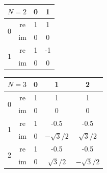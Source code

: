 \begin{center}
	\begin{tabular}{| c c c c |}
		\hline
		\multicolumn{2}{|c}{$N=2$} & \multicolumn{1}{c}{ \tiny 0} & \multicolumn{1}{c|}{ \tiny 1}      \\
		\hline
		\hline
		\multirow{2}{*}{0}         & re                           & 1                             & 1  \\
		                           & im                           & 0                             & 0  \\
		\hline\hline
		\multirow{2}{*}{1}         & re                           & 1                             & -1 \\
		                           & im                           & 0                             & 0  \\
		\hline
	\end{tabular}
\end{center}

\begin{center}
	\begin{tabular}{| c c c c c |}
		\hline
		\multicolumn{2}{|c}{$N=3$} & \multicolumn{1}{c}{ \tiny 0} & \multicolumn{1}{c}{ \tiny 1} & \multicolumn{1}{c|}{ \tiny 2}                 \\
		\hline
		\hline
		\multirow{2}{*}{0}         & re                           & 1                            & 1                             & 1             \\
		                           & im                           & 0                            & 0                             & 0             \\
		\hline\hline
		\multirow{2}{*}{1}         & re                           & 1                            & -0.5                          & -0.5          \\
		                           & im                           & 0                            & $-\sqrt{3}/2$                 & $\sqrt{3}/2$  \\
		\hline\hline
		\multirow{2}{*}{2}         & re                           & 1                            & -0.5                          & -0.5          \\
		                           & im                           & 0                            & $\sqrt{3}/2$                  & $-\sqrt{3}/2$ \\
		\hline
	\end{tabular}
\end{center}

